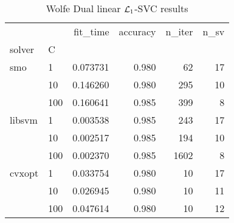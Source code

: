 \begin{table}[H]
\centering
\caption{Wolfe Dual linear $\protect \mathcal{L}_1$-SVC results}
\label{linear_dual_l1_svc_cv_results}
\begin{tabular}{llrrrr}
\toprule
       &     &  fit\_time &  accuracy &  n\_iter &  n\_sv \\
solver & C &           &           &         &       \\
\midrule
smo & 1   &  0.073731 &     0.980 &      62 &    17 \\
       & 10  &  0.146260 &     0.980 &     295 &    10 \\
       & 100 &  0.160641 &     0.985 &     399 &     8 \\
libsvm & 1   &  0.003538 &     0.985 &     243 &    17 \\
       & 10  &  0.002517 &     0.985 &     194 &    10 \\
       & 100 &  0.002370 &     0.985 &    1602 &     8 \\
cvxopt & 1   &  0.033754 &     0.980 &      10 &    17 \\
       & 10  &  0.026945 &     0.980 &      10 &    11 \\
       & 100 &  0.047614 &     0.980 &      10 &    12 \\
\bottomrule
\end{tabular}
\end{table}
